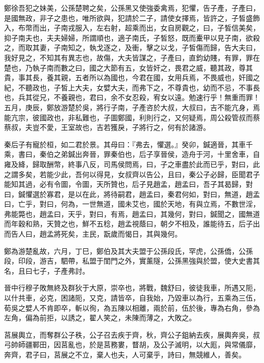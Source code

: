 \begin{pinyinscope}
鄭徐吾犯之妹美，公孫楚聘之矣，公孫黑又使強委禽焉，犯懼，告子產，子產曰，是國無政，非子之患也，唯所欲與，犯請於二子，請使女擇焉，皆許之，子皙盛飾入，布幣而出，子南戎服入，左右射，超乘而出，女自房觀之，曰，子皙信美矣，抑子南夫也，夫夫婦婦，所謂順也，適子南氏，子皙怒，既而櫜甲以見子南，欲殺之，而取其妻，子南知之，執戈逐之，及衝，擊之以戈，子皙傷而歸，告大夫曰，我好見之，不知其有異志也，故傷，大夫皆謀之，子產曰，直鈞幼賤，有罪，罪在楚也，乃執子南而數之曰，國之大節有五，女皆奸之，畏君之威，聽其政，尊其貴，事其長，養其親，五者所以為國也，今君在國，女用兵焉，不畏威也，奸國之紀，不聽政也，子皙上大夫，女嬖大夫，而弗下之，不尊貴也，幼而不忌，不事長也，兵其從兄，不養親也，君曰，余不女忍殺，宥女以遠。勉速行乎！無重而罪！五月，庚辰，鄭放游楚於吳，將行子南，子產咨於大叔，大叔曰，吉不能亢身，焉能亢宗，彼國政也，非私難也，子圖鄭國，利則行之，又何疑焉，周公殺管叔而蔡蔡叔，夫豈不愛，王室故也，吉若獲戾，子將行之，何有於諸游。

秦后子有寵於桓，如二君於景。其母曰：『弗去，懼選。』癸卯，鍼適晉，其車千乘，書曰，秦伯之弟鍼出奔晉，罪秦伯也，后子享晉侯，造舟于河，十里舍車，自雍及絳，歸取酬幣，終事八反，司馬侯問焉，曰，子之車盡於此而已乎，對曰，此之謂多矣，若能少此，吾何以得見，女叔齊以告公，且曰，秦公子必歸，臣聞君子能知其過，必有令圖，令圖，天所贊也，后子見趙孟，趙孟曰，吾子其曷歸，對曰，鍼懼選於寡君，是以在此，將待嗣君，趙孟曰，秦君何如，對曰，無道，趙孟曰，亡乎，對曰，何為，一世無道，國未艾也，國於天地，有與立焉，不數世淫，弗能斃也，趙孟曰，天乎，對曰，有焉，趙孟曰，其幾何，對曰，鍼聞之，國無道而年穀和熟，天贊之也，鮮不五稔，趙孟視蔭曰，朝夕不相及，誰能待五，后子出而告人曰，趙孟將死矣，主民，翫歲而愒日，其與幾何。

鄭為游楚亂故，六月，丁巳，鄭伯及其大夫盟于公孫段氏，罕虎，公孫僑，公孫段，印段，游吉，駟帶，私盟于閨門之外，實薰隧，公孫黑強與於盟，使大史書其名，且曰七子，子產弗討。

晉中行穆子敗無終及群狄于大原，崇卒也，將戰，魏舒曰，彼徒我車，所遇又阨，以什共車，必克，困諸阨，又克，請皆卒，自我始，乃毀車以為行，五乘為三伍，荀吳之嬖人不肯即卒，斬以徇，為五陳以相離，兩於前，伍於後，專為右角，參為左角，偏為前拒，以誘之，翟人笑之，未陳而薄之，大敗之。

莒展輿立，而奪群公子秩，公子召去疾于齊，秋，齊公子鉏納去疾，展輿奔吳，叔弓帥師疆鄆田，因莒亂也，於是莒務婁，瞀胡，及公子滅明，以大厖，與常儀靡，奔齊，君子曰，莒展之不立，棄人也夫，人可棄乎，詩曰，無競維人，善矣。


\end{pinyinscope}
